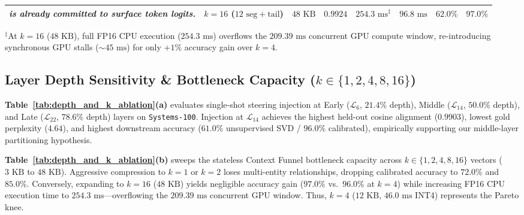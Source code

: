 \documentclass[10pt,twocolumn]{article}
\begin{document}
\begin{table}[t]
{\begin{tabular}{lcccc|lcccccc}
\multicolumn{5}{l|}{\footnotesize \emph{is already committed to surface token logits.}} & $k = 16$ ($12\text{ seg} + \text{tail}$) & $48\text{ KB}$ & $0.9924$ & $254.3\text{ ms}^\ddagger$ & $96.8\text{ ms}$ & $62.0\%$ & $97.0\%$ \\
\bottomrule
\end{tabular}%
}
\vspace{2pt}\par
{\footnotesize $^\ddagger$At $k=16$ ($48\text{ KB}$), full FP16 CPU execution ($254.3\text{ ms}$) overflows the $209.39\text{ ms}$ concurrent GPU compute window, re-introducing synchronous GPU stalls ($\sim 45\text{ ms}$) for only $+1\%$ accuracy gain over $k=4$.}
\end{table}

\subsection{Layer Depth Sensitivity \& Bottleneck Capacity ($k \in \{1, 2, 4, 8, 16\}$)}
\textbf{Table~\ref{tab:depth_and_k_ablation}(a)} evaluates single-shot steering injection at Early ($\mathcal{L}_6$, $21.4\%$ depth), Middle ($\mathcal{L}_{14}$, $50.0\%$ depth), and Late ($\mathcal{L}_{22}$, $78.6\%$ depth) layers on \texttt{Systems-100}. Injection at $\mathcal{L}_{14}$ achieves the highest held-out cosine alignment ($0.9903$), lowest gold perplexity ($4.64$), and highest downstream accuracy ($61.0\%$ unsupervised SVD / $96.0\%$ calibrated), empirically supporting our middle-layer partitioning hypothesis.

\textbf{Table~\ref{tab:depth_and_k_ablation}(b)} sweeps the stateless Context Funnel bottleneck capacity across $k \in \{1, 2, 4, 8, 16\}$ vectors ($3\text{ KB}$ to $48\text{ KB}$). Aggressive compression to $k=1$ or $k=2$ loses multi-entity relationships, dropping calibrated accuracy to $72.0\%$ and $85.0\%$. Conversely, expanding to $k=16$ ($48\text{ KB}$) yields negligible accuracy gain ($97.0\%$ vs.\ $96.0\%$ at $k=4$) while increasing FP16 CPU execution time to $254.3\text{ ms}$---overflowing the $209.39\text{ ms}$ concurrent GPU window. Thus, $k=4$ ($12\text{ KB}$, $46.0\text{ ms}$ INT4) represents the Pareto knee.
\end{document}
